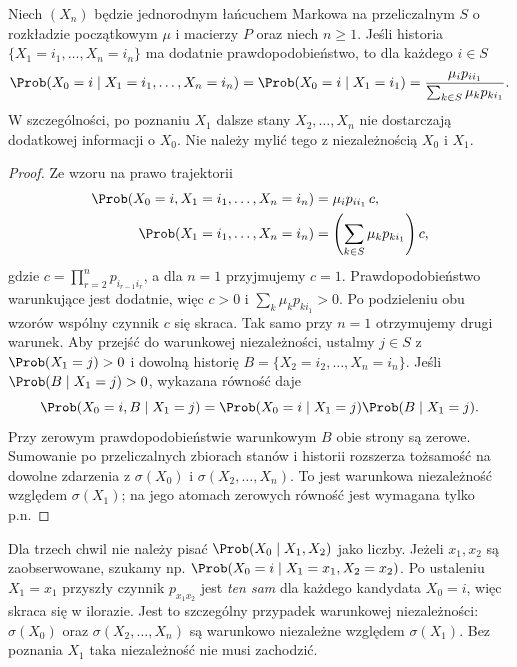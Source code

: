 \begin{twierdzenie}
Niech $(X_n)$ będzie jednorodnym łańcuchem Markowa
na przeliczalnym $S$ o rozkładzie początkowym
$\mu$ i macierzy $P$ oraz niech $n\geq1$.
Jeśli historia $\{X_1=i_1,\ldots,X_n=i_n\}$
ma dodatnie prawdopodobieństwo, to dla każdego $i\in S$
\[
\Prob(X_0=i\mid X_1=i_1,\ldots,X_n=i_n)
=\Prob(X_0=i\mid X_1=i_1)
=\frac{\mu_i p_{ii_1}}{\sum_{k\in S}\mu_kp_{ki_1}}.
\]
W szczególności, po poznaniu $X_1$ dalsze stany
$X_2,\ldots,X_n$ nie dostarczają dodatkowej informacji
o $X_0$. Nie należy mylić tego z niezależnością
$X_0$ i $X_1$.
\end{twierdzenie}
\begin{proof}
Ze wzoru na prawo trajektorii
\begin{align*}
\Prob(X_0=i, X_1=i_1,\ldots,X_n=i_n)
&=\mu_i p_{ii_1}\,c,\\
\Prob(X_1=i_1,\ldots,X_n=i_n)
&=\left(\sum_{k\in S}\mu_kp_{ki_1}\right)c,
\end{align*}
gdzie $c=\prod_{r=2}^np_{i_{r-1}i_r}$,
a dla $n=1$ przyjmujemy $c=1$. Prawdopodobieństwo
warunkujące jest dodatnie, więc $c>0$ i
$\sum_k\mu_kp_{ki_1}>0$. Po podzieleniu
obu wzorów wspólny czynnik $c$ się skraca.
Tak samo przy $n=1$ otrzymujemy drugi warunek.
Aby przejść do warunkowej niezależności, ustalmy
$j\in S$ z $\Prob(X_1=j)>0$ i dowolną historię
$B=\{X_2=i_2,\ldots,X_n=i_n\}$. Jeśli
$\Prob(B\mid X_1=j)>0$, wykazana równość daje
\[
\Prob(X_0=i,B\mid X_1=j)
=\Prob(X_0=i\mid X_1=j)\Prob(B\mid X_1=j).
\]
Przy zerowym prawdopodobieństwie warunkowym $B$
obie strony są zerowe. Sumowanie po przeliczalnych
zbiorach stanów i historii rozszerza tożsamość
na dowolne zdarzenia z $\sigma(X_0)$
i $\sigma(X_2,\ldots,X_n)$. To jest warunkowa
niezależność względem $\sigma(X_1)$; na jego atomach
zerowych równość jest wymagana tylko p.n.
\end{proof}


\begin{uwaga}
Dla trzech chwil nie należy pisać
$\Prob(X_0\mid X_1,X_2)$ jako liczby.
Jeżeli $x_1,x_2$ są zaobserwowane, szukamy np.
$\Prob(X_0=i\mid X_1=x_1,X_2=x_2)$.
Po ustaleniu $X_1=x_1$ przyszły czynnik
$p_{x_1x_2}$ jest \emph{ten sam} dla każdego
kandydata $X_0=i$, więc skraca się w ilorazie.
Jest to szczególny przypadek warunkowej niezależności:
$\sigma(X_0)$ oraz $\sigma(X_2,\ldots,X_n)$
są warunkowo niezależne względem $\sigma(X_1)$.
Bez poznania $X_1$ taka niezależność nie musi zachodzić.
\end{uwaga}

